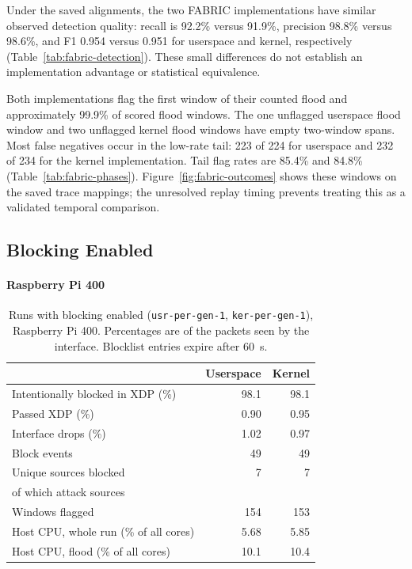 Under the saved alignments, the two FABRIC implementations have similar
observed detection quality: recall is 92.2\% versus 91.9\%, precision
98.8\% versus 98.6\%, and F1 0.954 versus 0.951 for userspace and kernel,
respectively (Table~\ref{tab:fabric-detection}). These small differences do
not establish an implementation advantage or statistical equivalence.

Both implementations flag the first window of their counted flood and
approximately 99.9\% of scored flood windows. The one unflagged userspace
flood window and two unflagged kernel flood windows have empty two-window
spans. Most false negatives occur in the low-rate tail: 223 of 224 for
userspace and 232 of 234 for the kernel implementation. Tail flag rates are
85.4\% and 84.8\% (Table~\ref{tab:fabric-phases}). Figure~\ref{fig:fabric-outcomes}
shows these windows on the saved trace mappings; the unresolved replay
timing prevents treating this as a validated temporal comparison.


\subsection{Blocking Enabled}
\label{sec:res-blocking}

\paragraph{Raspberry Pi 400}

\begin{table}[H]
  \centering
  \small
  \begin{tabular}{lrr}
    \toprule
    & Userspace & Kernel \\
    \midrule
    Intentionally blocked in XDP (\%)  & 98.1 & 98.1 \\
    Passed XDP (\%)                    & 0.90 & 0.95 \\
    Interface drops (\%)               & 1.02 & 0.97 \\
    \midrule
    Block events                       & 49   & 49 \\
    Unique sources blocked             & 7    & 7 \\
    \quad of which attack sources      & \fillin{} & \fillin{} \\
    Windows flagged                    & 154  & 153 \\
    \midrule
    Host CPU, whole run (\% of all cores) & 5.68 & 5.85 \\
    Host CPU, flood (\% of all cores)     & 10.1 & 10.4 \\
    \bottomrule
  \end{tabular}
  \caption{Runs with blocking enabled (\texttt{usr-per-gen-1},
  \texttt{ker-per-gen-1}), Raspberry Pi 400. Percentages are of the packets
  seen by the interface. Blocklist entries expire after 60~s.}
  \label{tab:blocking}
\end{table}


